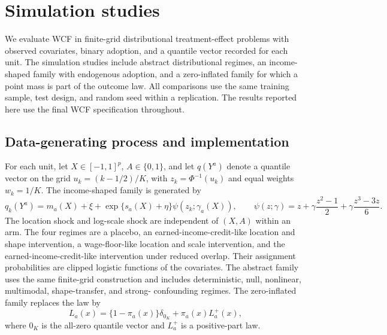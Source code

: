 
\section{Simulation studies}\label{sec:simulations}

We evaluate WCF in finite-grid distributional treatment-effect problems with
observed covariates, binary adoption, and a quantile vector recorded for each
unit. The simulation studies include abstract distributional regimes, an
income-shaped family with endogenous adoption, and a zero-inflated family for
which a point mass is part of the outcome law. All comparisons use the same
training sample, test design, and random seed within a replication. The
results reported here use the final WCF specification throughout.

\subsection{Data-generating process and implementation}

For each unit, let $X\in[-1,1]^p$, $A\in\{0,1\}$, and let $q(Y^a)$ denote a
quantile vector on the grid
$u_k=(k-1/2)/K$, with $z_k=\Phi^{-1}(u_k)$ and equal weights
$w_k=1/K$. The income-shaped family is generated by
\[
q_k(Y^a)=m_a(X)+\xi+\exp\{s_a(X)+\eta\}\psi(z_k;\gamma_a(X)),
\qquad
\psi(z;\gamma)=z+\gamma\frac{z^2-1}{2}
 +\gamma\frac{z^3-3z}{6}.
\]
The location shock and log-scale shock are independent of $(X,A)$ within an
arm. The four regimes are a placebo, an earned-income-credit-like location
and shape intervention, a wage-floor-like location and scale intervention,
and the earned-income-credit-like intervention under reduced overlap. Their
assignment probabilities are clipped logistic functions of the covariates.
The abstract family uses the same finite-grid construction and includes
deterministic, null, nonlinear, multimodal, shape-transfer, and strong-
confounding regimes. The zero-inflated family replaces the law by
\[
 L_a(x)=\{1-\pi_a(x)\}\delta_{0_K}+\pi_a(x)L_a^+(x),
\]
where $0_K$ is the all-zero quantile vector and $L_a^+$ is a positive-part
law.

